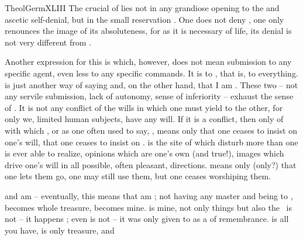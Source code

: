 \citet{Behold, in such a man must all thought of Self, all self-seeking,
self-will, and what cometh thereof, be utterly lost and surrendered and
given over to God, except in so far as they are necessary to make up a
person.}{TheolGerm}{XLIII} The crucial  of  lies
not in any grandiose opening to the  and ascetic self-denial, but in
the small reservation . One does not deny
, one only renounces the image of its absoluteness, for  as it is necessary  of life, its denial is not very
different from . 

\pa Another expression for this is  which, however, does not
mean submission to any specific agent, even less to any specific commands. It is
 to , that is, to everything.   is just
another way of saying  and, on the other hand, that
I am . These two -- not any servile submission, lack of autonomy,
sense of inferiority -- exhaust the sense of . It is not
any conflict of the wills in which one must yield to the other, for only we,
limited human subjects, have any will.  If it is a conflict, then only of  with  which  , or as one often used to say, , means only that one ceases to insist on one's will, that one
ceases to insist on .     is the site of  which
disturb more than one is ever able to realize, opinions which are one's own (and
true!), images which drive one's will in all possible, often pleasant,
directions.  means only (only?) that one lets them go, one may
still use them, but one ceases worshiping them.
  
 and  am  -- eventually, this means
that  am ; not having any master and being  to
,  becomes  whole treasure,  becomes
mine.   is mine, not only things but also the \sch\ is not 
-- it happens ; even  is not  -- it was only
given to  as a  of remembrance.
 is all you have, is  only treasure, and 

